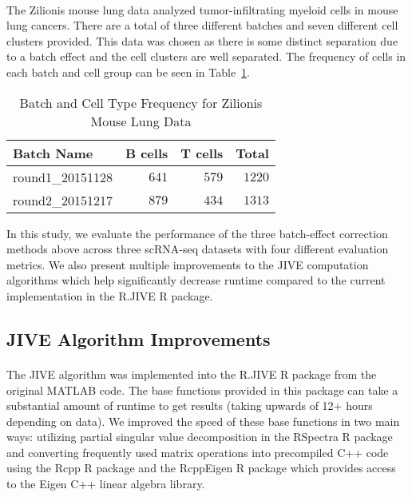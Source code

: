 \documentclass[
12pt, %
letterpaper, %
oneside, %
headinclude,footinclude, %
BCOR5mm, %
]{scrartcl}
\begin{document}
\paragraph*{}
The Zilionis mouse lung data \citep{zilionis2019single} analyzed tumor-infiltrating myeloid cells in mouse lung cancers. There are a total of three different batches and seven different cell clusters provided. This data was chosen as there is some distinct separation due to a batch effect and the cell clusters are well separated. The frequency of cells in each batch and cell group can be seen in Table~\ref{tab:freq_zilionis}.

\begin{table}[ht]
    \caption{Batch and Cell Type Frequency for Zilionis Mouse Lung Data}
    \centering
    \begin{tabular}{lrrr}
        \toprule
        Batch Name & B cells & T cells & Total \\
        \midrule
        round1\_20151128 & $641$ & $579$ & $1220$ \\
        round2\_20151217 & $879$ & $434$ & $1313$ \\
        \bottomrule
        \end{tabular}
    \label{tab:freq_zilionis}
\end{table}

In this study, we evaluate the performance of the three batch-effect correction methods above across three scRNA-seq datasets with four different evaluation metrics. We also present multiple improvements to the JIVE computation algorithms which help significantly decrease runtime compared to the current implementation in the R.JIVE R package.

\subsection{JIVE Algorithm Improvements} \label{jive_improvements}

\paragraph*{}
The JIVE algorithm was implemented into the R.JIVE R package \citep{o2016r} from the original MATLAB code. The base functions provided in this package can take a substantial amount of runtime to get results (taking upwards of 12+ hours depending on data). We improved the speed of these base functions in two main ways: utilizing partial singular value decomposition in the RSpectra R package \citep{qiu2019rspectra} and converting frequently used matrix operations into precompiled C++ code using the Rcpp R package \citep{edelbuettel2011rcpp} and the RcppEigen R package \citep{bates2013fast} which provides access to the Eigen C++ linear algebra library.
\end{document}
